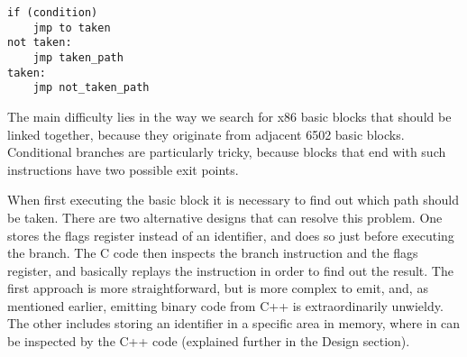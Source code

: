\begin{lstlisting}
if (condition)
    jmp to taken
not taken:
    jmp taken_path
taken:
    jmp not_taken_path
\end{lstlisting}

The main difficulty lies in the way we search for x86 basic blocks that should
be linked together, because they originate from adjacent 6502 basic blocks.
Conditional branches are particularly tricky, because blocks that end with such
instructions have two possible exit points. 

When first executing the basic block it is necessary to find out which path
should be taken.  There are two alternative designs that can resolve this
problem. One stores the flags register instead of an identifier, and does so
just before executing the branch.  The C code then inspects the branch
instruction and the flags register, and basically replays the instruction in
order to find out the result.  The first approach is more straightforward, but
is more complex to emit, and, as mentioned earlier, emitting binary code from
C++ is extraordinarily unwieldy. The other includes storing an identifier in a
specific area in memory, where in can be inspected by the C++ code (explained
further in the Design section).  


